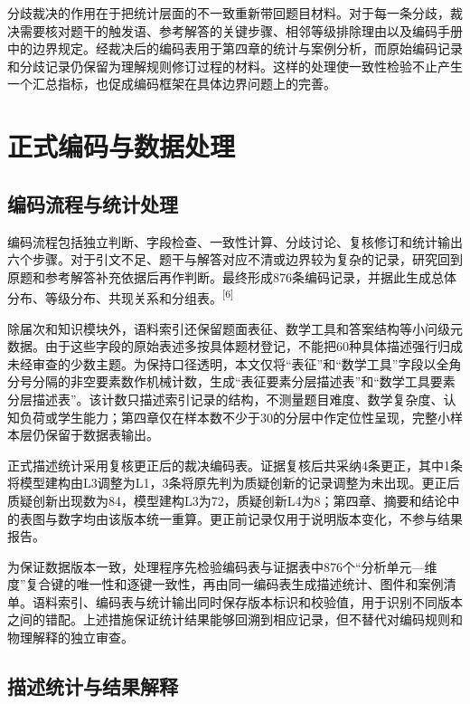 \documentclass[
  12pt,
  a4paper]{ctexbook}
\begin{document}
分歧裁决的作用在于把统计层面的不一致重新带回题目材料。对于每一条分歧，裁决需要核对题干的触发语、参考解答的关键步骤、相邻等级排除理由以及编码手册中的边界规定。经裁决后的编码表用于第四章的统计与案例分析，而原始编码记录和分歧记录仍保留为理解规则修订过程的材料。这样的处理使一致性检验不止产生一个汇总指标，也促成编码框架在具体边界问题上的完善。

\section{正式编码与数据处理}\label{ux6b63ux5f0fux7f16ux7801ux4e0eux6570ux636eux5904ux7406}

\subsection{编码流程与统计处理}\label{ux7f16ux7801ux6d41ux7a0bux4e0eux7edfux8ba1ux5904ux7406}

编码流程包括独立判断、字段检查、一致性计算、分歧讨论、复核修订和统计输出六个步骤。对于引文不足、题干与解答对应不清或边界较为复杂的记录，研究回到原题和参考解答补充依据后再作判断。最终形成876条编码记录，并据此生成总体分布、等级分布、共现关系和分组表。\textsuperscript{[6]}

除届次和知识模块外，语料索引还保留题面表征、数学工具和答案结构等小问级元数据。由于这些字段的原始表述多按具体题材登记，不能把60种具体描述强行归成未经审查的少数主题。为保持口径透明，本文仅将``表征''和``数学工具''字段以全角分号分隔的非空要素数作机械计数，生成``表征要素分层描述表''和``数学工具要素分层描述表''。该计数只描述索引记录的结构，不测量题目难度、数学复杂度、认知负荷或学生能力；第四章仅在样本数不少于30的分层中作定位性呈现，完整小样本层仍保留于数据表输出。

正式描述统计采用复核更正后的裁决编码表。证据复核后共采纳4条更正，其中1条将模型建构由L3调整为L1，3条将原先判为质疑创新的记录调整为未出现。更正后质疑创新出现数为84，模型建构L3为72，质疑创新L4为8；第四章、摘要和结论中的表图与数字均由该版本统一重算。更正前记录仅用于说明版本变化，不参与结果报告。

为保证数据版本一致，处理程序先检验编码表与证据表中876个``分析单元---维度''复合键的唯一性和逐键一致性，再由同一编码表生成描述统计、图件和案例清单。语料索引、编码表与统计输出同时保存版本标识和校验值，用于识别不同版本之间的错配。上述措施保证统计结果能够回溯到相应记录，但不替代对编码规则和物理解释的独立审查。

\subsection{描述统计与结果解释}\label{ux63cfux8ff0ux7edfux8ba1ux4e0eux7ed3ux679cux89e3ux91ca}
\end{document}
